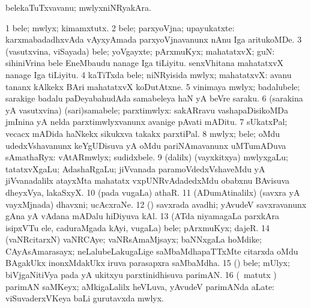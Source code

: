 \bentry
{} 
\gl{\nA}
\expl{}
\bmng
 belekaTuTxvavanu; mwlyxniNRyakAra. 
\emng
\eentry

\bentry
{} 
\gl{\nA}
\expl{}
\bmng
\bnum
\num{1} bele; mwlyx; kimamxtutx. 
\num{2} bele; parxyoVjna; upayukatxte:  karxmabadadhxvAda vAyxyAmada parxyoVjnavanunx nAnu Iga aritukoMDe. 
\num{3} (vasutxvina, viSayada) bele; yoVgayxte; pArxmuKyx; mahatatxvX; guN:  sihiniVrina bele EneMbaudu nanage Iga tiLiyitu.  senxVhitana mahatatxvX nanage Iga tiLiyitu. 
\num{4} kaTiTxda bele; niNRyisida mwlyx; mahatatxvX:  avanu tananx kAlkekx BAri mahatatxvX koDutAtxne. 
\num{5} vinimaya mwlyx; badalubele; sarakige badalu paDeyabahudAda samabeleya haN yA beVre saraku. 
\num{6} (sarakina yA vasutxvina) (sari)samabele; parxtimwlyx:  sakARravu vashapaDisikoMDa jmInina yA nelda parxtimwlyxvanunx avanige pAvati mADitu. 
\hypertarget{value(1)7}{} 
\num{7} sUkatxPal; vecacx mADida haNkekx sikukxva takakx parxtiPal. 
\num{8} mwlyx; bele; oMdu udedxVshavanunx keYgUDisuva yA oMdu pariNAmavanunx uMTumADuva sAmathaRyx:  vAtARmwlyx; sudidxbele. 
\num{9} (\bava dalilx) (vayxkitxya) mwlyxgaLu; tatatxvXgaLu; AdashaRgaLu; jiVvanada paramoVdedxVshaveMdu yA jiVvanadalilx atayxMta mahatatx vxpUNRvAdadedxMdu obabxnu BAvisuva dheyxVya, lakaSxyX. 
\num{10} (pada \mo vugaLa) athaR. 
\num{11} (ADumAtinalilx) (savxra yA vayxMjnada) dhavxni; ucAcxraNe. 
\num{12} (\saM) savxrada avadhi; yAvudeV savxravanunx gAna yA vAdana mADalu hiDiyuva kAl. 
\num{13} (ATda niyamagaLa parxkAra isipxVTu ele, caduraMgada kAyi, \mo vugaLa) bele; pArxmuKyx; dajeR. 
\num{14} (vaNRcitarxN) vaNRCAye; vaNRsAmaMjsayx; baNNxgaLa hoMdike; CAyAsAmarasayx; neLalubeLakugaLige saMbaMdhapaTTxMte citarxda oMdu BAgakUkx inonxMdakUkx iruva parasapxra saMbaMdha. 
\num{15} (\ga) bele; mUlyx; biVjgaNitiVya pada yA ukitxyu parxtinidhisuva parimAN. 
\num{16} (\Bwvi\ matutx \ravi) parimAN saMKeyx; aMkigaLalilx heVLuva, yAvudeV parimANda aLate:  viSuvaderxVKeya baLi gurutavxda mwlyx. 
\enum
\emng

\noindent
\gl{\pagu}
\expl{}
\bmng
\emng
\eentry

